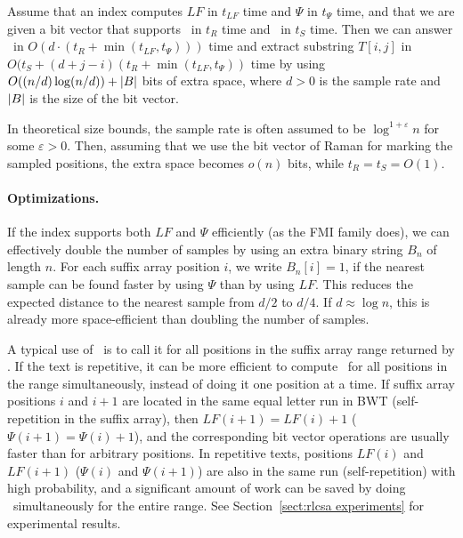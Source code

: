 \begin{theorem}\label{theorem:full functionality}
Assume that an index computes $LF$ in $t_{LF}$ time and $\Psi$ in $t_{\Psi}$ time, and that we are given a bit vector that supports \rank\ in $t_{R}$ time and \select\ in $t_{S}$ time. Then we can answer \locate\ in $O(d \cdot (t_{R} + \min(t_{LF}, t_{\Psi})))$ time and extract substring $T[i,j]$ in $O(t_{S} + (d + j - i)(t_{R} + \min(t_{LF}, t_{\Psi}))$ time by using $O((n/d) \log (n/d)) + \lvert B \rvert$ bits of extra space, where $d > 0$ is the sample rate and $\lvert B \rvert$ is the size of the bit vector.
\end{theorem}

In theoretical size bounds, the sample rate is often assumed to be $\log^{1+\varepsilon} n$ for some $\varepsilon > 0$. Then, assuming that we use the bit vector of Raman  for marking the sampled positions, the extra space becomes $o(n)$ bits, while $t_{R} = t_{S} = O(1)$.

\paragraph{Optimizations.}

If the index supports both $LF$ and $\Psi$ efficiently (as the FMI family does), we can effectively double the number of samples by using an extra binary string $B_{n}$ of length $n$. For each suffix array position $i$, we write $B_{n}[i] = 1$, if the nearest sample can be found faster by using $\Psi$ than by using $LF$. This reduces the expected distance to the nearest sample from $d/2$ to $d/4$. If $d \approx \log n$, this is already more space-efficient than doubling the number of samples.

A typical use of \locate\ is to call it for all positions in the suffix array range returned by \find. If the text is repetitive, it can be more efficient to compute \locate\ for all positions in the range simultaneously, instead of doing it one position at a time. If suffix array positions $i$ and $i+1$ are located in the same equal letter run in BWT (self-repetition in the suffix array), then $LF(i+1) = LF(i) + 1$ ($\Psi(i+1) = \Psi(i) + 1$), and the corresponding bit vector operations are usually faster than for arbitrary positions. In repetitive texts, positions $LF(i)$ and $LF(i+1)$ ($\Psi(i)$ and $\Psi(i+1)$) are also in the same run (self-repetition) with high probability, and a significant amount of work can be saved by doing \locate\ simultaneously for the entire range. See Section~\ref{sect:rlcsa experiments} for experimental results.


